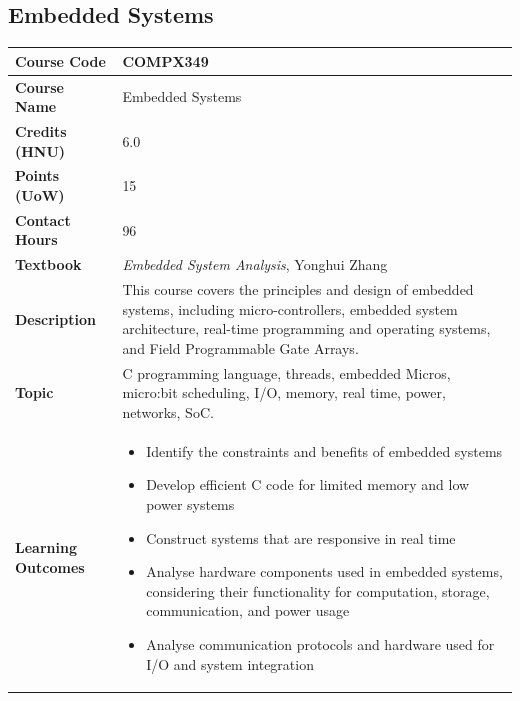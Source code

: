 \documentclass{article}
\begin{document}
\subsection[COMPX349 Embedded Systems]{Embedded Systems}
\renewcommand{\arraystretch}{1.5} %
\begin{longtable}{|p{3cm}|p{10cm}|}
\hline
\textbf{Course Code} & COMPX349 \\
\hline
\textbf{Course Name} & Embedded Systems \\
\hline
\textbf{Credits (HNU)} & 6.0 \\
\hline
\textbf{Points (UoW)} & 15 \\
\hline
\textbf{Contact Hours} & 96 \\
\hline
\textbf{Textbook} & \emph{Embedded System Analysis}, Yonghui Zhang \\
\hline
\textbf{Description} & This course covers the principles and design of embedded systems, including micro-controllers, embedded system architecture, real-time programming and operating systems, and Field Programmable Gate Arrays.\\
\hline
\textbf{Topic} & C programming language, 
threads, 
embedded Micros, 
micro:bit scheduling, 
I/O, 
memory, 
real time, 
power, 
networks, 
SoC. \\
\hline
\textbf{Learning Outcomes} & 
    \begin{itemize}
        \item Identify the constraints and benefits of embedded systems
        \item Develop efficient C code for limited memory and low power systems
        \item Construct systems that are responsive in real time
        \item Analyse hardware components used in embedded systems, considering their functionality for computation, storage, communication, and power usage
        \item Analyse communication protocols and hardware used for I/O and system integration
    \end{itemize} \\
\hline
\end{longtable}
\end{document}
